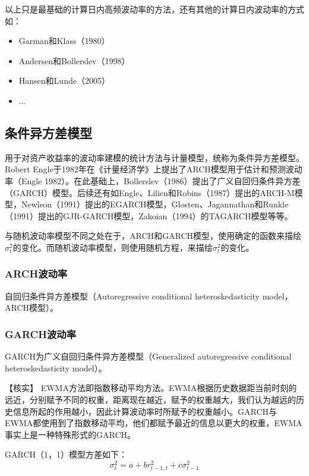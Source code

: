 \documentclass[11pt]{article}
\begin{document}
以上只是最基础的计算日内高频波动率的方法，还有其他的计算日内波动率的方式如：
\begin{itemize}
    \item Garman和Klass（1980）
    \item Andersen和Bollerslev（1998）
    \item Hansen和Lunde（2005）
    \item ...
\end{itemize}

\subsection{条件异方差模型}

用于对资产收益率的波动率建模的统计方法与计量模型，统称为条件异方差模型。Robert Engle于1982年在《计量经济学》上提出了ARCH模型用于估计和预测波动率（Engle 1982）。在此基础上，Bollerslev（1986）提出了广义自回归条件异方差（GARCH）模型。后续还有如Engle、Lilien和Robins（1987）提出的ARCH-M模型，Newlson（1991）提出的EGARCH模型，Glosten、Jagannathan和Runkle（1991）提出的GJR-GARCH模型，Zakoian（1994）的TAGARCH模型等等。

与随机波动率模型不同之处在于，ARCH和GARCH模型，使用确定的函数来描绘$\sigma_{t}^{2}$的变化。而随机波动率模型，则使用随机方程，来描绘$\sigma_{t}^{2}$的变化。

\subsubsection{ARCH波动率}

自回归条件异方差模型（Autoregressive conditional heteroskedasticity model，ARCH模型）。
\subsubsection{GARCH波动率}

GARCH为广义自回归条件异方差模型（Generalized autoregressive conditional heteroskedasticity model）。

【核实】
EWMA方法即指数移动平均方法。EWMA根据历史数据距当前时刻的远近，分别赋予不同的权重，距离现在越近，赋予的权重越大，我们认为越远的历史信息所起的作用越小，因此计算波动率时所赋予的权重越小。GARCH与EWMA都使用到了指数移动平均，他们都赋予最近的信息以更大的权重，EWMA事实上是一种特殊形式的GARCH。

GARCH（1，1）模型方差如下：
\begin{equation*}
    \sigma^{2}_{t} = a + b r^{2}_{t-1,t} + c \sigma^{2}_{t-1}
\end{equation*}
\end{document}
